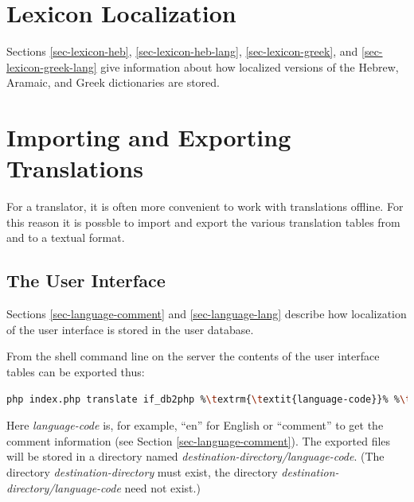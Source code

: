 \documentclass[11pt,oneside,a4paper]{memoir}
\begin{document}
\section{Lexicon Localization}\label{sec-lex-loc}

Sections \ref{sec-lexicon-heb}, \ref{sec-lexicon-heb-lang}, \ref{sec-lexicon-greek}, and
\ref{sec-lexicon-greek-lang} give information about how localized versions of the Hebrew, Aramaic,
and Greek dictionaries are stored.


\section{Importing and Exporting Translations}\label{sec-imp-exp-trans}%
%

For a translator, it is often more convenient to work with translations offline. For this reason it
is possble to import and export the various translation tables from and to a textual format.

\subsection{The User Interface}

Sections \ref{sec-language-comment} and \ref{sec-language-lang} describe how localization of the
user interface is stored in the user database.

From the shell command line on the server the contents of the user interface tables can be exported
thus:

\begin{lstlisting}[language=bash,basicstyle={\ttfamily}]
php index.php translate if_db2php %\textrm{\textit{language-code}}% %\textrm{\textit{destination-directory}}%
\end{lstlisting}

Here \emph{language-code} is, for example, ``en'' for English or ``comment'' to get the
comment information (see Section \ref{sec-language-comment}). The exported files will be stored in a
directory named
\emph{destination-directory/language-code}. (The directory
\emph{destination-directory} must exist, the directory \emph{destination-directory/language-code}
need not exist.)
\end{document}

